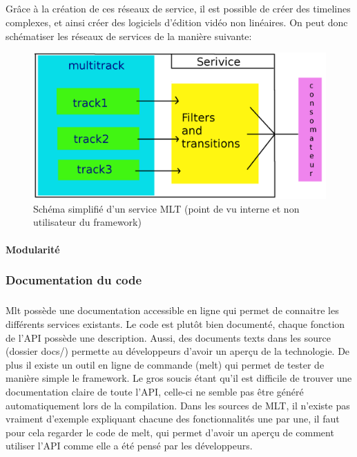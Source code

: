 \subparagraph{}

Grâce à la création de ces réseaux de service, il est possible de
créer des timelines complexes, et ainsi créer des logiciels d'édition
vidéo non linéaires. On peut donc schématiser les réseaux de services
de la manière suivante:

\begin{figure} [H]

  \begin{center}

    \includegraphics[width=1.0\textwidth]{images/service}

  \end{center}

  \caption{Schéma simplifié d'un service MLT (point de vu interne et
    non utilisateur du framework)}

  \label{Yes}

\end{figure}

\paragraph{Modularité}

\subsubsection{Documentation du code}

\subparagraph{}

Mlt possède une documentation accessible en ligne qui permet de connaitre
les différents services existants. Le code est plutôt bien documenté,
chaque fonction de l'API possède une description. Aussi, des documents
texts dans les source (dossier docs/) permette au développeurs d'avoir un
aperçu de la technologie. De plus il existe un outil en ligne de commande
(melt) qui permet de tester de manière simple le framework. Le gros
soucis étant qu'il est difficile de trouver une documentation claire
de toute l'API, celle-ci ne semble pas être généré automatiquement
lors de la compilation. Dans les sources de MLT, il n'existe pas vraiment
d'exemple expliquant chacune des fonctionnalités une par une, il faut
pour cela regarder le code de melt, qui permet d'avoir un aperçu de
comment utiliser l'API comme elle a été pensé par les développeurs.

